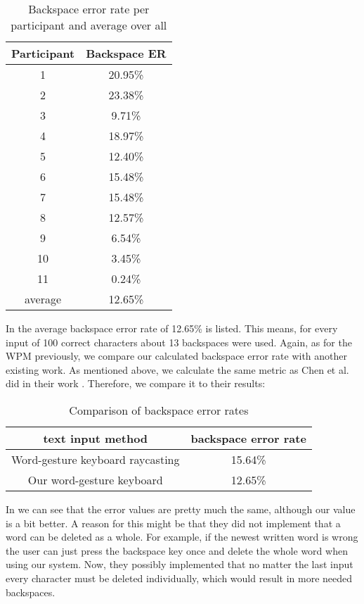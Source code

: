 \fi
\begin{table}[H]
    \centering
    \caption{Backspace error rate per participant and average over all}
    \begin{tabular}{cc} \toprule
        Participant&Backspace ER\\ \midrule
        1 & 20.95\%\\
        2 & 23.38\%\\
        3 & 9.71\%\\
        4 & 18.97\%\\
        5 & 12.40\%\\
        6 & 15.48\%\\
        7 & 15.48\%\\
        8 & 12.57\%\\
        9 & 6.54\%\\
        10 & 3.45\%\\
        11 & 0.24\%\\
        \midrule
        average & 12.65\%\\
        \bottomrule
    \end{tabular}
    \label{tab:backspace_er}
\end{table}
In  the average backspace error rate of 12.65\% is listed. This means, for every input of 100 correct characters about 13 backspaces were used. Again, as for the WPM previously, we compare our calculated backspace error rate with another existing work. As mentioned above, we calculate the same metric as Chen et al. did in their work \cite{10.1145/3290607.3312762}. Therefore, we compare it to their results:
\begin{table}[H]
    \centering
    \caption{Comparison of backspace error rates}
    \begin{tabular}{cc} \toprule
        text input method&backspace error rate\\ \midrule
        Word-gesture keyboard raycasting&15.64\%\\
        Our word-gesture keyboard&12.65\%\\
        \bottomrule
    \end{tabular}
    \label{tab:error_backspace_compare}
\end{table}
In  we can see that the error values are pretty much the same, although our value is a bit better. A reason for this might be that they did not implement that a word can be deleted as a whole. For example, if the newest written word is wrong the user can just press the backspace key once and delete the whole word when using our system. Now, they possibly implemented that no matter the last input every character must be deleted individually, which would result in more needed backspaces.

